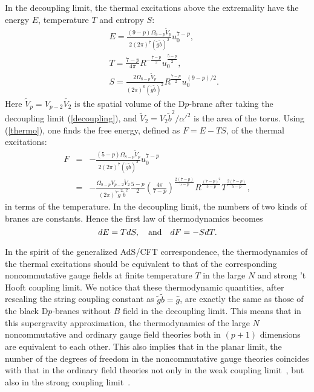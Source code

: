 \documentclass[a4paper,12pt]{article}
\begin{document}
In the decoupling limit, the thermal excitations above the extremality have
the energy $E$, temperature $T$ and entropy $S$:
\begin{eqnarray}
&& E = \frac{(9-p)\Omega_{8-p}\tilde{V}_p}{2(2\pi)^7 (\tilde{g}\tilde{b})^2}
  u_0^{7-p}, \nonumber\\
&& T = \frac{7-p}{4\pi}R^{-\frac{7-p}{2}}u_0^{\frac{5-p}{2}}, \nonumber \\
\label{thermo}
&& S = \frac{2\Omega_{8-p}\tilde{V}_p}{(2\pi)^6(\tilde{g}\tilde{b})^2}
  R^{\frac{7-p}{2}}u_0^{(9-p)/2}.
\end{eqnarray}
Here $\tilde{V}_p=V_{p-2}\tilde{V_2}$ is the spatial volume of the D$p$-brane
after taking the decoupling limit (\ref{decoupling}), and $\tilde{V}_2
= V_2 \tilde{b}^2/\alpha'^2$ is the area of the torus.
Using (\ref{thermo}), one finds the free energy, defined as $F=E-TS$, of the
thermal excitations:
\begin{eqnarray}
F &=& - \frac{(5-p)\Omega_{8-p}\tilde{V}_p}{2(2\pi)^7(\tilde{g}\tilde{b})^2}
 u_0^{7-p} \nonumber \\
\label{freeenergy}
 &=& -\frac{\Omega_{8-p}V_{p-2}\tilde{V}_2}{(2\pi)^7 \tilde{g}^2
  \tilde{b}^2} \frac{5-p}{2}\left(\frac{4\pi}{7-p}\right)^{\frac{2(7-p)}
    {5-p}} R^{\frac{(7-p)^2}{5-p}}T^{\frac{2(7-p)}{5-p}},
\end{eqnarray}
in terms of the temperature. In the decoupling limit, the numbers of two
kinds of branes are constants. Hence the first law of thermodynamics becomes
\begin{equation}
dE = TdS, \ \ \ {\rm and}\ \ \ dF = - SdT.
\end{equation}

In the spirit of the generalized AdS/CFT correspondence, the thermodynamics
of the thermal excitations should be equivalent to that of the corresponding
noncommutative gauge fields at finite temperature $T$ in the large $N$
and strong 't Hooft coupling limit. We notice that these thermodynamic
quantities, after rescaling the string coupling constant as
$\tilde{g}\tilde{b}=\hat{g}$, are exactly the same as those of the black
D$p$-branes without $B$ field in the decoupling limit. This means that in
this supergravity approximation, the thermodynamics of the large $N$
noncommutative and ordinary gauge field theories both in $(p+1)$ dimensions
are equivalent to each other. This also
implies that in the planar limit, the number of the degrees of freedom in
the noncommutative gauge theories coincides with that in the ordinary field
theories not only in the weak coupling limit~\cite{BS}, but also in the
strong coupling limit~\cite{Mald1,Ali,Bar,Harmark}.
\end{document}
